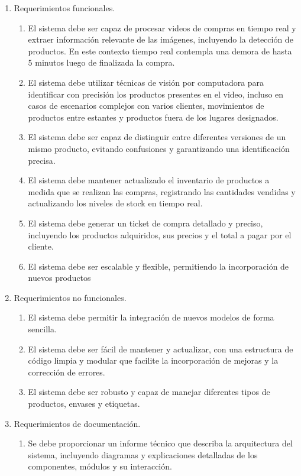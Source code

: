\documentclass[
11pt, %
]{charter}
\begin{document}
\begin{enumerate}
	\item Requerimientos funcionales.
		\begin{enumerate}
			\item El sistema debe ser capaz de procesar videos de compras en tiempo real y extraer información relevante de las imágenes, incluyendo la detección de productos. En este contexto tiempo real contempla una demora de hasta 5 minutos luego de finalizada la compra.
			\item El sistema debe utilizar técnicas de visión por computadora para identificar con precisión los productos presentes en el video, incluso en casos de escenarios complejos con varios clientes, movimientos de productos entre estantes y productos fuera de los lugares designados.
			\item El sistema debe ser capaz de distinguir entre diferentes versiones de un mismo producto, evitando confusiones y garantizando una identificación precisa.
			\item El sistema debe mantener actualizado el inventario de productos a medida que se realizan las compras, registrando las cantidades vendidas y actualizando los niveles de stock en tiempo real.
			\item El sistema debe generar un ticket de compra detallado y preciso, incluyendo los productos adquiridos, sus precios y el total a pagar por el cliente.
			\item El sistema debe ser escalable y flexible, permitiendo la incorporación de nuevos productos
		\end{enumerate}
	\item Requerimientos no funcionales.
		\begin{enumerate}
		\item El sistema debe permitir la integración de nuevos modelos de forma sencilla.
			\item El sistema debe ser fácil de mantener y actualizar, con una estructura de código limpia y modular que facilite la incorporación de mejoras y la corrección de errores.
			\item El sistema debe ser robusto y capaz de manejar diferentes tipos de productos, envases y etiquetas.
		\end{enumerate}
		\item Requerimientos de documentación.
		\begin{enumerate}
			\item Se debe proporcionar un informe técnico que describa la arquitectura del sistema, incluyendo diagramas y explicaciones detalladas de los componentes, módulos y su interacción.

\end{enumerate}
\end{enumerate}
\end{document}
